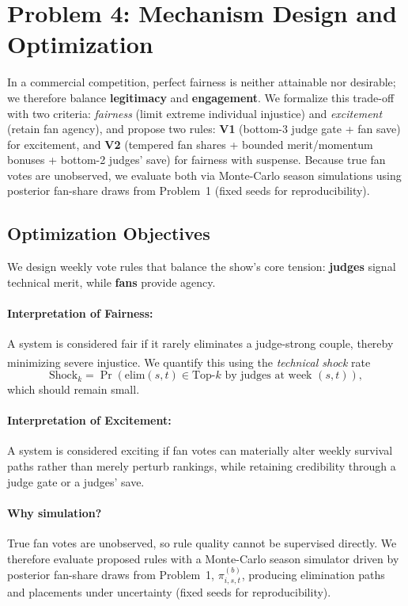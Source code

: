 \documentclass[12pt]{article}
\begin{document}
\section{Problem 4: Mechanism Design and Optimization}

In a commercial competition, perfect fairness is neither attainable nor desirable; we therefore balance \textbf{legitimacy} and \textbf{engagement}. We formalize this trade-off with two criteria: \emph{fairness} (limit extreme individual injustice) and \emph{excitement} (retain fan agency), and propose two rules: \textbf{V1} (bottom-3 judge gate + fan save) for excitement, and \textbf{V2} (tempered fan shares + bounded merit/momentum bonuses + bottom-2 judges' save) for fairness with suspense. Because true fan votes are unobserved, we evaluate both via Monte-Carlo season simulations using posterior fan-share draws from Problem~1 (fixed seeds for reproducibility).


\subsection{Optimization Objectives}
We design weekly vote rules that balance the show’s core tension: \textbf{judges} signal technical merit, while \textbf{fans} provide agency.

\paragraph{Interpretation of Fairness:}
A system is considered fair if it rarely eliminates a judge-strong couple, thereby minimizing severe injustice.\textsuperscript{\cite{rawls1971}}
We quantify this using the \emph{technical shock} rate
\begin{equation}
	\text{Shock}_k=\Pr\!\left(\text{elim}(s,t)\in \text{Top-}k \text{ by judges at week }(s,t)\right),
\end{equation}
which should remain small.

\paragraph{Interpretation of Excitement:}
A system is considered exciting if fan votes can materially alter weekly survival paths rather than merely perturb rankings, while retaining credibility through a judge gate or a judges’ save.


\paragraph{Why simulation?}
True fan votes are unobserved, so rule quality cannot be supervised directly. We therefore evaluate proposed rules with a Monte-Carlo season simulator driven by posterior fan-share draws from Problem~1, $\pi^{(b)}_{i,s,t}$, producing elimination paths and placements under uncertainty (fixed seeds for reproducibility).
\end{document}
